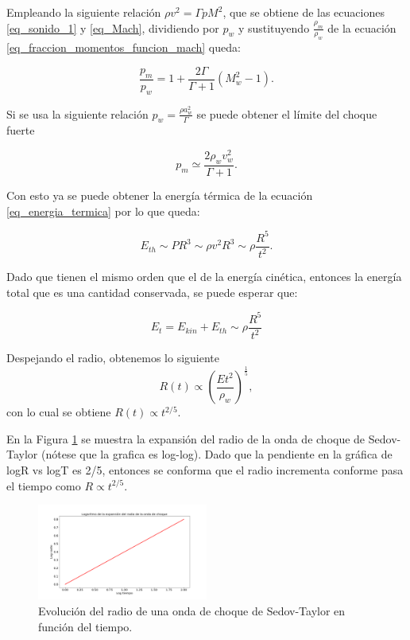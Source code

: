 \documentclass[12pt,a4paper]{book}
\begin{document}
\noindent Empleando la siguiente relación $\rho v^2 = \Gamma p M^2$, que se obtiene de las ecuaciones \ref{eq_sonido_1} y \ref{eq_Mach}, dividiendo por $p_w$ y sustituyendo  $\frac{\rho_m}{\rho_w}$ de la ecuación \ref{eq_fraccion_momentos_funcion_mach} queda:

\begin{equation} \label{eq_fraccion_Presiones}
  \frac{p_m}{p_w} = 1 + \frac{2 \Gamma}{\Gamma + 1} \left( M_w^2 -1\right).
\end{equation}

\noindent Si se usa la siguiente relación $ p_w = \frac{\rho a_w^2 }{\Gamma}$ se puede obtener el límite del choque fuerte

\begin{equation}
  p_m  \simeq \frac{2 \rho_w v_w^2}{\Gamma + 1}.
\end{equation}

\noindent Con esto ya se puede obtener la energía térmica de la ecuación \ref{eq_energia_termica} por lo que queda: 

\begin{equation}
  E_{th} \sim P R^3 \sim \rho v^2 R^3 \sim \rho \frac{R^5}{t^2}.
\end{equation}

\noindent Dado que tienen el mismo orden que el de la energía cinética, entonces la energía total que es una cantidad conservada, se puede esperar que:

\begin{equation}
  E_t = E_{kin} + E_{th} \sim \rho \frac{R^5}{t^2}
\end{equation}

\noindent Despejando el radio, obtenemos lo siguiente
\begin{equation} \label{eq_Radio_proporcional}
  R(t) \varpropto \left(\frac{E t^2}{\rho_w}\right)^{\frac{1}{5}},
\end{equation}
con lo cual se obtiene $R(t) \varpropto t^{2/5}$.

En la Figura \ref{fig_Radio_v_tiempo} se muestra la expansión del radio de la onda de choque de Sedov-Taylor (nótese que la grafica es log-log). Dado que la pendiente en la gráfica de logR vs logT es 2/5, entonces se conforma que el radio incrementa conforme pasa el tiempo como $R \propto t^{2/5}$.

\begin{figure}
  \centering
    \includegraphics[width=0.5\textwidth]{Figuras/capitulo_2/Radio_vs_tiempo.png}
  \caption{Evolución del radio de una onda de choque de Sedov-Taylor en función del tiempo.} \label{fig_Radio_v_tiempo}
\end{figure}
\end{document}
